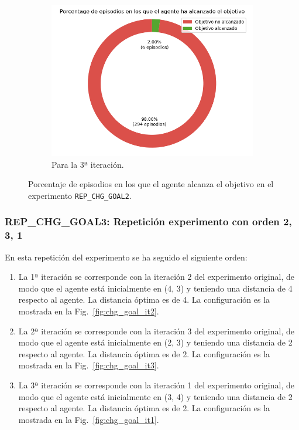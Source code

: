\begin{figure}
\begin{subfigure}{.5\textwidth}
    \end{subfigure}
    \begin{subfigure}{.5\textwidth}
        \centering
        \includegraphics[scale=0.3]{cap5_experimentacion/images/CHANGE_GOAL-20_09-21_35-1, 0, 2_it3_porcentajeResuelto.png}
        \caption{Para la 3ª iteración.}
        \label{fig:CHANGE_GOAL-20_09-21_35-1, 0, 2_it3_porcentajeResuelto}
    \end{subfigure}%
    \caption{Porcentaje de episodios en los que el agente alcanza el objetivo en el experimento \texttt{REP\_CHG\_GOAL2}.}
    \label{fig:CHANGE_GOAL-20_09-21_35-1, 0, 2_porcentajeResuelto}
\end{figure}
 
\subsubsection{REP\_CHG\_GOAL3: Repetición experimento con orden 2, 3, 1} \label{REP_CHG_GOAL3}

En esta repetición del experimento se ha seguido el siguiente orden: 
\begin{enumerate}
    \item La 1ª iteración se corresponde con la iteración 2 del experimento original, de modo que el agente está inicialmente en (4, 3) y teniendo una distancia de 4 respecto al agente. La distancia óptima es de 4. La configuración es la mostrada en la Fig.~\ref{fig:chg_goal_it2}.
    \item La 2ª iteración se corresponde con la iteración 3 del experimento original, de modo que el agente está inicialmente en (2, 3) y teniendo una distancia de 2 respecto al agente. La distancia óptima es de 2. La configuración es la mostrada en la Fig.~\ref{fig:chg_goal_it3}.
    \item La 3ª iteración se corresponde con la iteración 1 del experimento original, de modo que el agente está inicialmente en (3, 4) y teniendo una distancia de 2 respecto al agente. La distancia óptima es de 2. La configuración es la mostrada en la Fig.~\ref{fig:chg_goal_it1}.
\end{enumerate}

